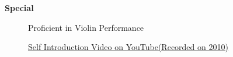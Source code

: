 \documentclass[letterpaper,11pt]{article}
\newcommand{\resheading}[1]{{\large \colorbox{mygrey}{\begin{minipage}{\textwidth}{\textbf{#1 \vphantom{p\^{E}}}}\end{minipage}}}}
\begin{document}
\resheading{{Special}}
	\begin{description}
        \item[] {Proficient in Violin Performance}
        \item[] {\href{http://www.youtube.com/watch?v=zGBpT7A_nYM}{Self Introduction Video on YouTube(Recorded on 2010)}}
	
	\end{description}
\end{document}
